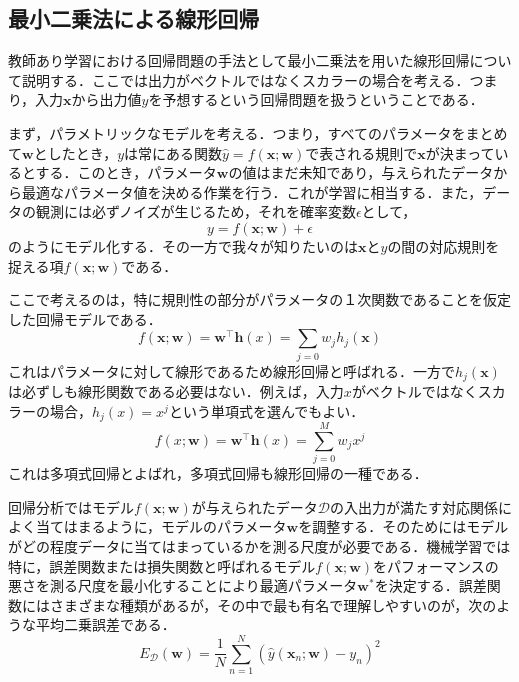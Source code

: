 \documentclass[a4paper,11pt]{jsreport}
\begin{document}
\subsection{最小二乗法による線形回帰}
教師あり学習における回帰問題の手法として最小二乗法を用いた線形回帰について説明する．ここでは出力がベクトルではなくスカラーの場合を考える．つまり，入力$\bm{x}$から出力値$y$を予想するという回帰問題を扱うということである．\par
まず，パラメトリックなモデルを考える．つまり，すべてのパラメータをまとめて$\bm{w}$としたとき，$y$は常にある関数$\hat{y} = f(\bm{x}; \bm{w})$で表される規則で$\bm{x}$が決まっているとする．このとき，パラメータ$\bm{w}$の値はまだ未知であり，与えられたデータから最適なパラメータ値を決める作業を行う．これが学習に相当する．また，データの観測には必ずノイズが生じるため，それを確率変数$\epsilon$として，
\begin{equation}
  y = f(\bm{x}; \bm{w}) + \epsilon
\end{equation}
のようにモデル化する．その一方で我々が知りたいのは$\bm{x}$と$y$の間の対応規則を捉える項$f(\bm{x}; \bm{w})$である．\par
ここで考えるのは，特に規則性の部分がパラメータの１次関数であることを仮定した回帰モデルである．
\begin{equation}
  f(\bm{x}; \bm{w})
  = \bm{w}^{\top} \bm{h}(x) 
  = \sum_{j=0} w_j h_j(\bm{x})
\end{equation}
これはパラメータに対して線形であるため線形回帰と呼ばれる．一方で$h_j(\bm{x})$は必ずしも線形関数である必要はない．例えば，入力$x$がベクトルではなくスカラーの場合，$h_j(x) = x^j$という単項式を選んでもよい．
\begin{equation}
  f(x; \bm{w}) = \bm{w}^{\top} \bm{h}(x) = \sum_{j=0}^M w_j x^j
\end{equation}
これは多項式回帰とよばれ，多項式回帰も線形回帰の一種である．\par
回帰分析ではモデル$f(\bm{x}; \bm{w})$が与えられたデータ$\mathcal{D}$の入出力が満たす対応関係によく当てはまるように，モデルのパラメータ$\bm{w}$を調整する．そのためにはモデルがどの程度データに当てはまっているかを測る尺度が必要である．機械学習では特に，誤差関数または損失関数と呼ばれるモデル$f(\bm{x}; \bm{w})$をパフォーマンスの悪さを測る尺度を最小化することにより最適パラメータ$\bm{w}^*$を決定する．誤差関数にはさまざまな種類があるが，その中で最も有名で理解しやすいのが，次のような平均二乗誤差である．
\begin{equation}
  E_{\mathcal{D}}(\bm{w})
  = \frac{1}{N} \sum_{n=1}^{N}(\hat{y}(\bm{x}_n; \bm{w}) - y_n)^2
\end{equation}
\end{document}
